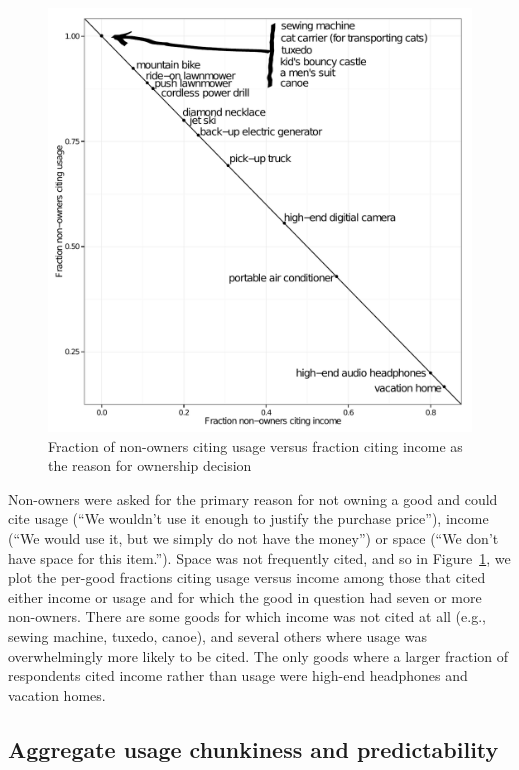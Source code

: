 \documentclass[11pt]{article}
\begin{document}
\begin{figure}
\centering 
\caption{Fraction of non-owners citing usage versus fraction citing income as the reason for ownership decision} 
\label{fig:reasons}
\begin{minipage}{0.60 \linewidth}
\includegraphics[width = \linewidth]{./plots/reasons_for_nonownership.pdf} 
\end{minipage} 
\end{figure} 

Non-owners were asked for the primary reason for not owning a good and could cite usage (``We wouldn't use it enough to justify the purchase price''), income  (``We would use it, but we simply do not have the money'') or space (``We don't have space for this item.'').
Space was not frequently cited, and so in Figure~\ref{fig:reasons}, we plot the per-good fractions citing usage versus income among those that cited either income or usage and for which the good in question had seven or more non-owners. 
There are some goods for which income was not cited at all (e.g., sewing machine, tuxedo, canoe), and several others where usage was overwhelmingly more likely to be cited.
The only goods where a larger fraction of respondents cited income rather than usage were high-end headphones and vacation homes. 

\subsection{Aggregate usage chunkiness and predictability} 
\end{document}
